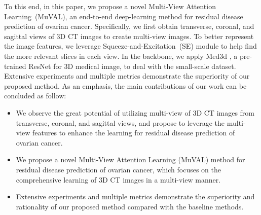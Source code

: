 To this end, in this paper, we propose a novel Multi-View Attention Learning~(MuVAL), an end-to-end deep-learning method for residual disease prediction of ovarian cancer. 
Specifically, we first obtain transverse, coronal, and sagittal views of 3D CT images to create multi-view images.
To better represent the image features, we leverage Squeeze-and-Excitation~(SE) \cite{he2016deep} module to help find the more relevant slices in each view.  
In the backbone, we apply Med3d \cite{chen2019med3d}, a pre-trained ResNet \cite{he2016deep} for 3D medical image, to deal with the small-scale dataset.
Extensive experiments and multiple metrics demonstrate the superiority of our proposed method.
As an emphasis, the main contributions of our work can be concluded as follow: 
\begin{itemize}
    \item We observe the great potential of utilizing multi-view of 3D CT images from transverse, coronal, and sagittal views, and propose to leverage the multi-view features to enhance the learning for residual disease prediction of ovarian cancer.
    \item We propose a novel Multi-View Attention Learning (MuVAL) method for residual disease prediction of ovarian cancer, which focuses on the comprehensive learning of 3D CT images in a multi-view manner.
    \item Extensive experiments and multiple metrics demonstrate the superiority and rationality of our proposed method compared with the baseline methods.
\end{itemize}